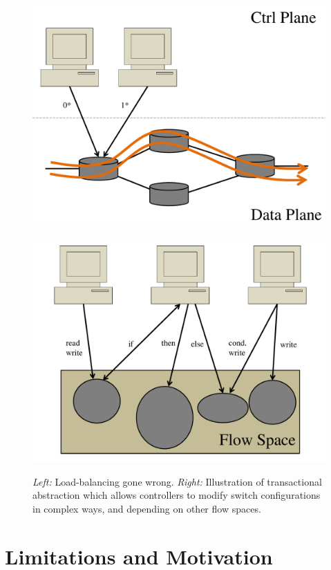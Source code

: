 \documentclass[conference]{sigcomm-alternate}
\begin{document}
\begin{figure}[t]
\centering
\includegraphics[width=0.8\columnwidth]{loadbal.pdf}~~
\includegraphics[width=0.8\columnwidth]{pic.pdf}\\
\caption{\emph{Left:} Load-balancing gone wrong. \emph{Right:} Illustration of transactional abstraction which  allows
controllers to modify switch configurations in complex ways,
and
depending on other flow spaces.}\label{fig:illu}
\end{figure}

\section{Limitations and Motivation}\label{sec:motivation}
\end{document}
